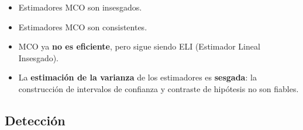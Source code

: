 \documentclass[10pt, a4paper, landscape]{extarticle}
\begin{document}
\begin{multicols}{3}
\begin{itemize}[leftmargin=*]
	\item Estimadores MCO son insesgados.
	\item Estimadores MCO son consistentes.
	\item MCO ya \textbf{no es eficiente}, pero sigue siendo ELI (Estimador Lineal Insesgado).
	\item La \textbf{estimación de la varianza} de los estimadores es \textbf{sesgada}: la construcción de intervalos de confianza y contraste de hipótesis no son fiables.
\end{itemize}

\subsection*{Detección}


\end{multicols}
\end{document}
